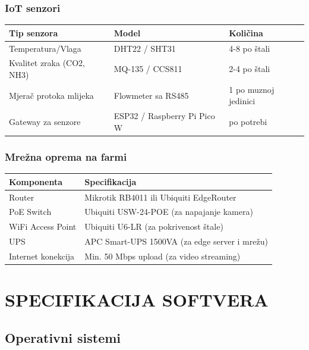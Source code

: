 \documentclass{article}
\begin{document}
\subsubsection{IoT senzori}

\begin{center}
\begin{tabular}{|l|l|l|}
\hline
\rowcolor{lightgray}
\textbf{Tip senzora} & \textbf{Model} & \textbf{Količina} \\
\hline
Temperatura/Vlaga & DHT22 / SHT31 & 4-8 po štali \\
\hline
Kvalitet zraka (CO2, NH3) & MQ-135 / CCS811 & 2-4 po štali \\
\hline
Mjerač protoka mlijeka & Flowmeter sa RS485 & 1 po muznoj jedinici \\
\hline
Gateway za senzore & ESP32 / Raspberry Pi Pico W & po potrebi \\
\hline
\end{tabular}
\end{center}

\subsubsection{Mrežna oprema na farmi}

\begin{center}
\begin{tabular}{|l|l|}
\hline
\rowcolor{lightgray}
\textbf{Komponenta} & \textbf{Specifikacija} \\
\hline
Router & Mikrotik RB4011 ili Ubiquiti EdgeRouter \\
\hline
PoE Switch & Ubiquiti USW-24-POE (za napajanje kamera) \\
\hline
WiFi Access Point & Ubiquiti U6-LR (za pokrivenost štale) \\
\hline
UPS & APC Smart-UPS 1500VA (za edge server i mrežu) \\
\hline
Internet konekcija & Min. 50 Mbps upload (za video streaming) \\
\hline
\end{tabular}
\end{center}

\newpage
\section{SPECIFIKACIJA SOFTVERA}

\subsection{Operativni sistemi}
\end{document}
